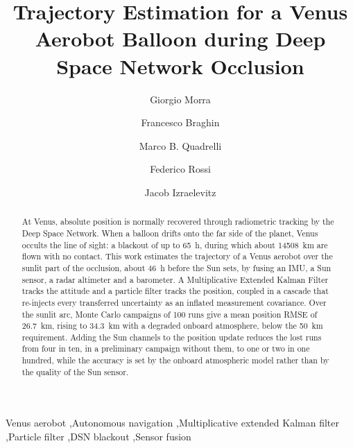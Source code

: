 \documentclass[preprint,12pt,a4paper]{elsarticle}
\begin{document}
\begin{frontmatter}

\title{Trajectory Estimation for a Venus Aerobot Balloon during Deep Space Network Occlusion}

\author[polimi,jpl]{Giorgio Morra}
\author[polimi]{Francesco Braghin}
\author[jpl]{Marco B. Quadrelli}
\author[jpl]{Federico Rossi}
\author[jpl]{Jacob Izraelevitz}



\begin{abstract}
At Venus, absolute position is normally recovered through radiometric tracking by the Deep Space Network. When a balloon drifts onto the far side of the planet, Venus occults the line of sight: a blackout of up to \SI{65}{h}, during which about \SI{14508}{km} are flown with no contact. This work estimates the trajectory of a Venus aerobot over the sunlit part of the occlusion, about \SI{46}{h} before the Sun sets, by fusing an IMU, a Sun sensor, a radar altimeter and a barometer. A Multiplicative Extended Kalman Filter tracks the attitude and a particle filter tracks the position, coupled in a cascade that re-injects every transferred uncertainty as an inflated measurement covariance. Over the sunlit arc, Monte Carlo campaigns of 100 runs give a mean position RMSE of \SI{26.7}{km}, rising to \SI{34.3}{km} with a degraded onboard atmosphere, below the \SI{50}{km} requirement. Adding the Sun channels to the position update reduces the lost runs from four in ten, in a preliminary campaign without them, to one or two in one hundred, while the accuracy is set by the onboard atmospheric model rather than by the quality of the Sun sensor.
\end{abstract}

\begin{keyword}
Venus aerobot \sep Autonomous navigation \sep Multiplicative extended Kalman filter \sep Particle filter \sep DSN blackout \sep Sensor fusion
\end{keyword}

\end{frontmatter}
\end{document}
